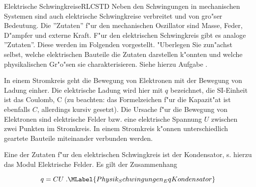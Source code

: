 \begin{MXContent}{Elektrische Schwingkreise}{RLC}{STD}%
Neben den Schwingungen in mechanischen Systemen sind auch elektrische Schwingkreise verbreitet und von gro"ser Bedeutung. Die ''Zutaten'' f"ur den mechanischen Oszillator sind Masse, Feder, D"ampfer und externe Kraft. F"ur den elektrischen Schwingkreis gibt es analoge ''Zutaten''. Diese werden im Folgenden vorgestellt. "Uberlegen Sie zun"achst selbst, welche elektrischen Bauteile die Zutaten darstellen k"onnten und welche physikalischen Gr"o"sen sie charakterisieren. Siehe hierzu Aufgabe
.

In einem Stromkreis geht die Bewegung von Elektronen mit der Bewegung von Ladung einher. Die elektrische Ladung wird hier mit $q$ bezeichnet, die SI-Einheit ist das Coulomb, C (zu beachten: das Formelzeichen f"ur die Kapazit"at ist ebenfalls $C$, allerdings kursiv gesetzt). Die Ursache f"ur die Bewegung von Elektronen sind elektrische Felder bzw. eine elektrische Spannung $U$ zwischen zwei Punkten im Stromkreis. In einem Stromkreis k"onnen unterschiedlich geartete Bauteile miteinander verbunden werden.

Eine der Zutaten f"ur den elektrischen Schwingkreis ist der Kondensator, s. hierzu das Modul \glqq Elektrische Felder\grqq. Es gilt der Zusammenhang

\begin{equation}
  q = C U\; .\MLabel{Physik_Schwingungen_EqKondensator}
\end{equation}


\end{MXContent}
